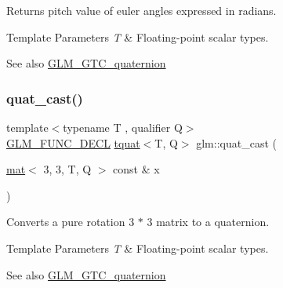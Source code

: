 Returns pitch value of euler angles expressed in radians.


\begin{DoxyTemplParams}{Template Parameters}
{\em T} & Floating-\/point scalar types.\\
\hline
\end{DoxyTemplParams}
\begin{DoxySeeAlso}{See also}
\hyperlink{group__gtc__quaternion}{G\+L\+M\+\_\+\+G\+T\+C\+\_\+quaternion} 
\end{DoxySeeAlso}
\mbox{\label{group__gtc__quaternion_ga03e023aec9acd561a28594bbc8a3abf6}} 
\subsubsection{\texorpdfstring{quat\+\_\+cast()}{quat\_cast()}\hspace{0.1cm}{\footnotesize\ttfamily [1/2]}}
{\footnotesize\ttfamily template$<$typename T , qualifier Q$>$ \\
\hyperlink{setup_8hpp_ab2d052de21a70539923e9bcbf6e83a51}{G\+L\+M\+\_\+\+F\+U\+N\+C\+\_\+\+D\+E\+CL} \hyperlink{structglm_1_1tquat}{tquat}$<$T, Q$>$ glm\+::quat\+\_\+cast (\begin{DoxyParamCaption}\item[{\hyperlink{structglm_1_1mat}{mat}$<$ 3, 3, T, Q $>$ const \&}]{x }\end{DoxyParamCaption})}

Converts a pure rotation 3 $\ast$ 3 matrix to a quaternion.


\begin{DoxyTemplParams}{Template Parameters}
{\em T} & Floating-\/point scalar types.\\
\hline
\end{DoxyTemplParams}
\begin{DoxySeeAlso}{See also}
\hyperlink{group__gtc__quaternion}{G\+L\+M\+\_\+\+G\+T\+C\+\_\+quaternion} 
\end{DoxySeeAlso}
\mbox{\label{group__gtc__quaternion_ga50bb9aecf42fdab04e16039ab6a81c60}} 
